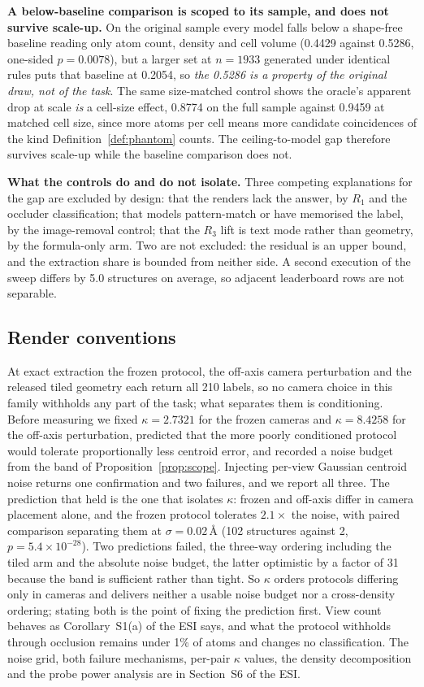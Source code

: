 \textbf{A below-baseline comparison is scoped to its sample, and does not survive scale-up.} On the
original sample every model falls below a shape-free baseline reading only atom count, density and cell
volume (0.4429 against 0.5286, one-sided $p = 0.0078$), but a larger set at $n = 1933$ generated under
identical rules puts that baseline at 0.2054, so \emph{the 0.5286 is a property of the original draw, not of
the task}. The same size-matched control shows the oracle's apparent drop at scale \emph{is} a cell-size
effect, 0.8774 on the full sample against 0.9459 at matched cell size, since more atoms per cell means more
candidate coincidences of the kind Definition~\ref{def:phantom} counts. The ceiling-to-model gap therefore
survives scale-up while the baseline comparison does not.

\textbf{What the controls do and do not isolate.} Three competing explanations for the gap are excluded by
design: that the renders lack the answer, by $R_1$ and the occluder classification; that models pattern-match
or have memorised the label, by the image-removal control; that the $R_3$ lift is text mode rather than
geometry, by the formula-only arm. Two are not excluded: the residual is an upper bound, and the extraction
share is bounded from neither side. A second execution of the
sweep differs by 5.0 structures on average, so adjacent leaderboard rows are not separable.

\subsection{Render conventions}
\label{sec:conventions}

At exact extraction the frozen protocol, the off-axis camera perturbation and the released tiled geometry
each return all 210 labels, so no camera choice in this family withholds any part of the task; what separates
them is conditioning. Before measuring we fixed $\kappa = 2.7321$ for the frozen cameras and
$\kappa = 8.4258$ for the off-axis perturbation, predicted that the more poorly conditioned protocol would
tolerate proportionally less centroid error, and recorded a noise budget from the band of
Proposition~\ref{prop:scope}. Injecting per-view Gaussian centroid noise returns one confirmation and two
failures, and we report all three. The prediction that held is the one that isolates $\kappa$: frozen and
off-axis differ in camera placement alone, and the frozen protocol tolerates $2.1\times$ the noise, with
paired comparison separating them at $\sigma = 0.02$\,\AA{} (102 structures against 2,
$p = 5.4\times10^{-28}$). Two predictions failed, the three-way ordering including the tiled arm and the
absolute noise budget, the latter optimistic by a factor of 31 because the band is sufficient rather than
tight. So $\kappa$ orders protocols differing only in cameras and delivers neither a usable noise budget nor a
cross-density ordering; stating both is the point of fixing the prediction first. View count behaves as
Corollary~S1(a) of the ESI\dag{} says, and what the protocol withholds through occlusion remains under 1\% of
atoms and changes no classification. The noise grid, both failure mechanisms, per-pair $\kappa$ values, the
density decomposition and the probe power analysis are in Section~S6 of the ESI\dag{}.

